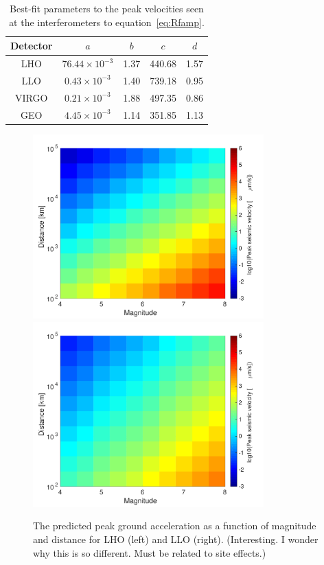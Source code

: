 \documentclass[reprint, prl, aps, showpacs]{revtex4-1}
\newcommand{\rednote}[1]{{\color{red} (#1)}}
\begin{document}
\begin{table}[]
\centering
\begin{tabular}{|c|c|c|c|c|}
\hline
Detector & $a$ & $b$ & $c$ & $d$ \\ \hline
LHO & $76.44\times 10^{-3}$ & 1.37 & 440.68 & 1.57 \\ \hline
LLO & $0.43\times 10^{-3}$ & 1.40 & 739.18 & 0.95 \\ \hline
VIRGO & $0.21\times 10^{-3}$ & 1.88 & 497.35 & 0.86 \\ \hline
GEO & $4.45\times 10^{-3}$ & 1.14 & 351.85 & 1.13 \\ \hline
\end{tabular}
\caption{Best-fit parameters to the peak velocities seen at the interferometers to equation~\ref{eq:Rfamp}.}
\label{table:fit}
\end{table}

\begin{figure}[t]
\hspace*{-0.5cm}
 \includegraphics[width=3.5in]{LHO_M_r.pdf}
 \includegraphics[width=3.5in]{LLO_M_r.pdf}
 \caption{The predicted peak ground acceleration as a function of magnitude and distance for LHO (left) and LLO (right). \rednote{Interesting. I wonder why this is so different. Must be related to site effects.}}
 \label{fig:MvsR}
\end{figure}
\end{document}
